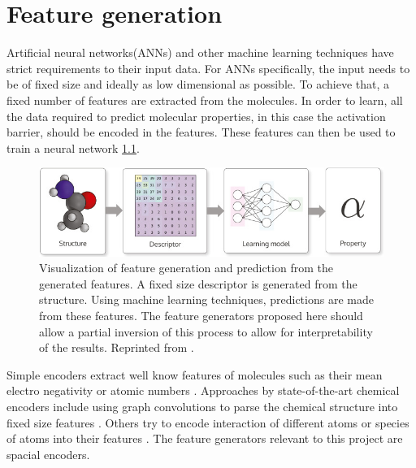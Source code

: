 
\chapter{Feature generation}
\label{ch:features}
Artificial neural networks(ANNs) and other machine learning techniques have strict requirements to their input data.
For ANNs specifically, the input needs to be of fixed size and ideally as low dimensional as possible.
To achieve that, a fixed number of features are extracted from the molecules.
In order to learn, all the data required to predict molecular properties, in this case the activation barrier, should be encoded in the features.
These features can then be used to train a neural network \ref{fig:feature-process}.

\begin{figure}
  \centering
  \includegraphics[width=12cm]{figures/introduction/chem-descriptor.jpg}
  \caption[Machine learning in chemistry]{Visualization of feature generation and prediction from the generated features. 
  A fixed size descriptor is generated from the structure. Using machine learning techniques, 
  predictions are made from these features.
  The feature generators proposed here should allow a partial inversion of this process to allow for interpretability of the results.
  Reprinted from \cite{dscribe}.}
  \label{fig:feature-process}
\end{figure}


Simple encoders extract well know features of molecules such as their mean electro negativity or atomic numbers \cite{LO20181538}.
Approaches by state-of-the-art chemical encoders include using graph convolutions to parse the chemical structure into fixed size features \cite{GNN_ENCODER}.
Others try to encode interaction of different atoms or species of atoms into their features \cite{PhysRevLett.108.058301}.
The feature generators relevant to this project are spacial encoders.

